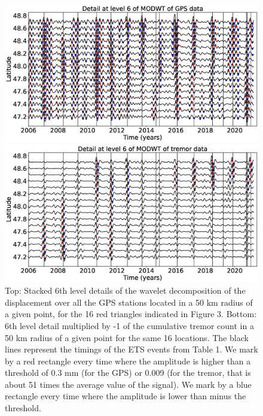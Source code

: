 \documentclass{article}
\begin{document}
\begin{figure}
\noindent\includegraphics[width=\textwidth, trim={0cm 0cm 0cm 0cm},clip]{figures/GPS_longer_detail_6.eps}

\noindent\includegraphics[width=\textwidth, trim={0cm 0cm 0cm 0cm},clip]{figures/tremor_longer_detail_6.eps}
\caption{Top: Stacked 6th level details of the wavelet decomposition of the displacement over all the GPS stations located in a 50 km radius of a given point, for the 16 red triangles indicated in Figure 3. Bottom: 6th level detail multiplied by -1 of the cumulative tremor count in a 50 km radius of a given point for the same 16 locations. The black lines represent the timings of the ETS events from Table 1. We mark by a red rectangle every time where the amplitude is higher than a threshold of 0.3 mm (for the GPS) or 0.009 (for the tremor, that is about 51 times the average value of the signal). We mark by a blue rectangle every time where the amplitude is lower than minus the threshold.}
\label{pngfiguresample}
\end{figure}
\end{document}
